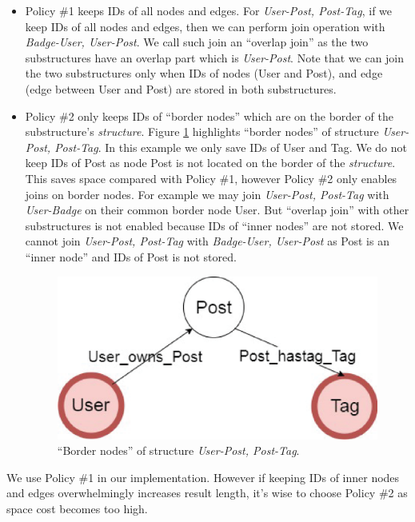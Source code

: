 \begin{itemize}
\item Policy \#1 keeps IDs of all nodes and edges. For \textit{User-Post, Post-Tag}, if we keep IDs of all nodes and edges, then we can perform join operation with \textit{Badge-User, User-Post}. We call such join an ``overlap join'' as the two substructures have an overlap part which is \textit{User-Post}. Note that we can join the two substructures only when IDs of nodes (User and Post), and edge (edge between User and Post) are stored in both substructures.

\item Policy \#2 only keeps IDs of ``border nodes'' which are on the border of the substructure's \textit{structure}. Figure \ref{border node} highlights ``border nodes'' of structure \textit{User-Post, Post-Tag}. In this example we only save IDs of User and Tag. We do not keep IDs of Post as node Post is not located on the border of the \textit{structure}. This saves space compared with Policy \#1, however Policy \#2 only enables joins on border nodes. For example we may join \textit{User-Post, Post-Tag} with \textit{User-Badge} on their common border node User. But ``overlap join'' with other substructures is not enabled because IDs of ``inner nodes'' are not stored. We cannot join \textit{User-Post, Post-Tag} with \textit{Badge-User, User-Post} as Post is an ``inner node'' and IDs of Post is not stored. 

\begin{figure}[h]
	\centering
	\includegraphics[scale=0.5]{pic/bordernode.eps}
	\caption{``Border nodes'' of structure \textit{User-Post, Post-Tag}.}
	\label{border node}
\end{figure}
\end{itemize}


We use Policy \#1 in our implementation. However if keeping IDs of inner nodes and edges overwhelmingly increases result length, it's wise to choose Policy \#2 as space cost becomes too high.

